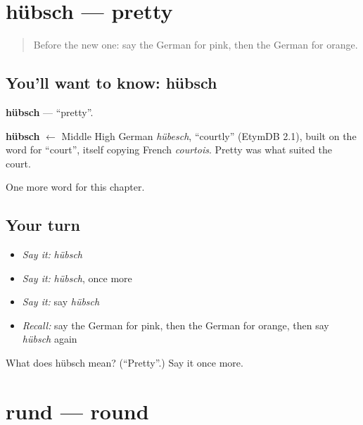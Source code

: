 \section[hübsch]{hübsch — pretty}

\label{lesson:GE-C130-huebsch}



\begin{quote}
Before the new one: say the German for pink, then the German for orange.
\end{quote}

\subsection*{You'll want to know: hübsch}
\textbf{hübsch} — \textquotedblleft{}pretty\textquotedblright{}.

\begin{cousinweb}
\textbf{hübsch} $\leftarrow$ Middle High German \emph{hübesch}, \textquotedblleft{}courtly\textquotedblright{} (EtymDB 2.1), built on the word for \textquotedblleft{}court\textquotedblright{}, itself copying French \emph{courtois}. Pretty was what suited the court.
\end{cousinweb}

\begin{grammarlens}[title={What you've built}]
One more word for this chapter.
\end{grammarlens}

\subsection*{Your turn}
\begin{itemize}
\raggedright
  \item \emph{Say it:} \emph{hübsch}
  \item \emph{Say it:} \emph{hübsch}, once more
  \item \emph{Say it:} say \emph{hübsch}
  \item \emph{Recall:} say the German for pink, then the German for orange, then say \emph{hübsch} again
\end{itemize}

\begin{tcolorbox}[breakable,colback=teal!4,colframe=teal!35!black,title={Before you move on}]
What does hübsch mean? (\textquotedblleft{}Pretty\textquotedblright{}.) Say it once more.
\end{tcolorbox}
\section[rund]{rund — round}

